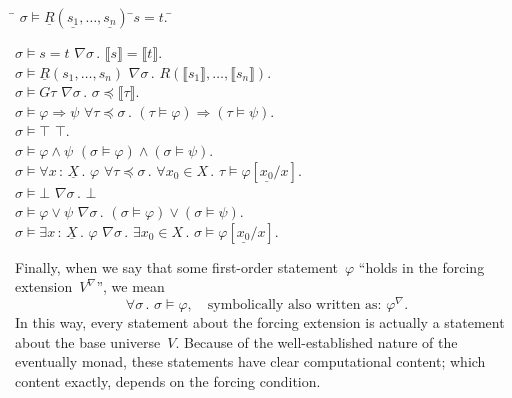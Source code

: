 \documentclass[com,11pt,crcready]{iosart2x}
\theoremstyle{definition}
\theoremstyle{plain}
\theoremstyle{remark}
\newcommand{\?}{\,{:}\,}
\newcommand{\forces}{\vDash}
\renewcommand{\_}{\mathpunct{.}\,}
\begin{document}
\begin{tabbing}
  \qquad \= $\sigma \forces \underline{R}(\underline{s_1},\ldots,\underline{s_n})$ \=  $s = t$. \= \kill

  \> $\sigma \forces s = t$
  \>  $\nabla \sigma\_ \llbracket s \rrbracket = \llbracket t \rrbracket$. \\[0.3em]

  \> $\sigma \forces \underline{R}(s_1,\ldots,s_n)$
  \>  $\nabla\sigma\_ R(\llbracket s_1 \rrbracket,\ldots,\llbracket s_n \rrbracket)$. \\[0.3em]

  \> $\sigma \forces G\tau$
  \>  $\nabla\sigma\_ \sigma \preccurlyeq \llbracket\tau\rrbracket$. \\[0.3em]

  \> $\sigma \forces \varphi \Rightarrow \psi$
  \>  $\forall \tau \preccurlyeq \sigma\_ (\tau \forces \varphi) \Rightarrow
  (\tau \forces \psi)$. \\[0.3em]

  \> $\sigma \forces \top$ \>  $\top$. \\[0.3em]

  \> $\sigma \forces \varphi \wedge \psi$
  \>  $(\sigma \forces \varphi) \wedge (\sigma \forces \psi)$. \\[0.3em]

  \> $\sigma \forces \forall x\?\underline{X}\_ \varphi$
  \>  $\forall \tau \preccurlyeq \sigma\_ \forall x_0 \in X\_ \tau \forces
  \varphi[\underline{x_0}/x]$. \\[0.3em]

  \> $\sigma \forces \bot$ \>  $\nabla\sigma\_ \bot$ \\[0.3em]

  \> $\sigma \forces \varphi \vee \psi$
  \>  $\nabla\sigma\_ (\sigma \forces \varphi) \vee (\sigma \forces \psi)$. \\[0.3em]

  \> $\sigma \forces \exists x\?\underline{X}\_ \varphi$
  \>  $\nabla\sigma\_ \exists x_0 \in X\_ \sigma \forces \varphi[\underline{x_0}/x]$.
\end{tabbing}
Finally, when we say that some first-order statement~$\varphi$ ``holds in the
forcing extension~$V^\nabla$'', we mean
\[ \forall \sigma\_ \sigma \forces \varphi,
\quad\text{symbolically also written as: $\varphi^\nabla$.} \]
In this way, every statement about the forcing extension is actually a
statement about the base universe~$V$. Because of the well-established nature
of the eventually monad, these statements have clear computational content;
which content exactly, depends on the forcing condition.
\end{document}
